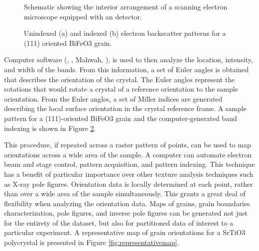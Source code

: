 \documentclass[12pt,%
              twoside,
               letterpaper]{uiothesis}
\begin{document}
\begin{figure}
\centering
	\caption[Interior  arrangement for  analysis]{%
	Schematic showing the interior arrangement of a scanning 
	electron microscope equipped with an  detector.}
	\label{fig:ebsdsetup}
\end{figure}

\begin{figure}
\begin{center}
\caption[Electron backscatter diffraction patterns]{%
	Unindexed (a) and indexed (b) electron backscatter patterns 
	for a (111) oriented BiFeO3 grain.}
\label{fig:ebsdsamples}
\end{center}
\end{figure}
Computer software (, , Mahwah, ), is used to then analyze
the location, intensity, and width of the bands. From this information, a set of Euler
angles is obtained that describes the orientation of the crystal. The Euler angles
represent the rotations that would rotate a crystal of a reference orientation to the
sample orientation. From the Euler angles, a set of Miller indices are generated
describing the local surface orientation in the crystal reference frame. A sample pattern
for a (111)-oriented BiFeO3 grain and the computer-generated band indexing is shown
in Figure \ref{fig:ebsdsamples}.


This procedure, if repeated across a raster pattern of points, can be used to map
orientations across a wide area of the sample. A computer can automate electron beam and
stage control, pattern acquisition, and pattern indexing. This technique has a benefit of
particular importance over other texture analysis techniques such as X-ray pole figures.
Orientation data is locally determined at each point, rather than over a wide area of the
sample simultaneously. This grants a great deal of flexibility when analyzing the
orientation data. Maps of grains, grain boundaries characterization, pole figures, and
inverse pole figures can be generated not just for the entirety  of the dataset, but also
for partitioned data of interest to a particular experiment. A representative map of grain
orientations for a SrTiO3 polycrystal is presented in Figure
\ref{fig:representativemap}.
\end{document}
